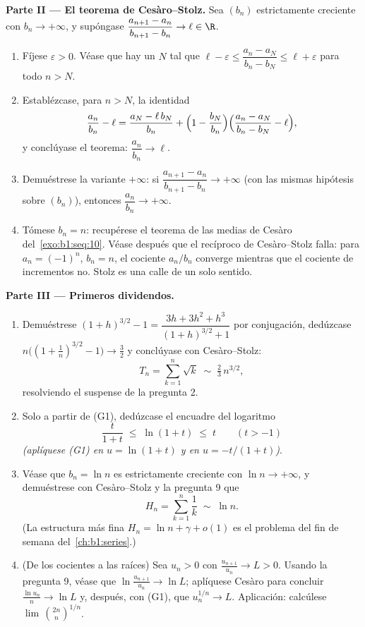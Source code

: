 \begin{problem}[{Problema del fin de semana --- el teorema de
Cesàro--Stolz y la asintótica $u_n \sim \sqrt{3/n}$ para
$u_{n+1} = \sin u_n$}]
\medskip
\noindent\textbf{Parte II --- El teorema de Cesàro--Stolz.} Sea
$(b_n)$ estrictamente creciente con $b_n \to +\infty$, y supóngase
$\dfrac{a_{n+1} - a_n}{b_{n+1} - b_n} \to \ell \in \R$.
\begin{enumerate}[resume]
  \item Fíjese $\varepsilon > 0$. Véase que hay un $N$ tal que
        $\ell - \varepsilon \leq \dfrac{a_n - a_N}{b_n - b_N}
        \leq \ell + \varepsilon$ para todo $n > N$.
  \item Establézcase, para $n > N$, la identidad
        \[
        \frac{a_n}{b_n} - \ell
        = \frac{a_N - \ell\,b_N}{b_n}
        + \Bigl(1 - \frac{b_N}{b_n}\Bigr)
        \Bigl(\frac{a_n - a_N}{b_n - b_N} - \ell\Bigr),
        \]
        y conclúyase el teorema: $\dfrac{a_n}{b_n} \to \ell$.
  \item Demuéstrese la variante $+\infty$: si $\dfrac{a_{n+1} -
        a_n}{b_{n+1} - b_n} \to +\infty$ (con las mismas hipótesis
        sobre $(b_n)$), entonces $\dfrac{a_n}{b_n} \to +\infty$.
  \item Tómese $b_n = n$: recupérese el teorema de las medias de
        Cesàro del~\cref{exo:b1:seq:10}. Véase después que el
        recíproco de Cesàro--Stolz falla: para $a_n = (-1)^n$,
        $b_n = n$, el cociente $a_n/b_n$ converge mientras que el
        cociente de incrementos no. Stolz es una calle de un solo
        sentido.
\end{enumerate}

\medskip
\noindent\textbf{Parte III --- Primeros dividendos.}
\begin{enumerate}[resume]
  \item Demuéstrese $(1+h)^{3/2} - 1 = \dfrac{3h + 3h^2 +
        h^3}{(1+h)^{3/2} + 1}$ por conjugación, dedúzcase
        $n\bigl((1 + \tfrac1n)^{3/2} - 1\bigr) \to \tfrac32$ y
        conclúyase con Cesàro--Stolz:
        \[
        T_n = \sum_{k=1}^{n} \sqrt k \;\sim\; \tfrac23\,
        n^{3/2} ,
        \]
        resolviendo el suspense de la pregunta 2.
  \item Solo a partir de (G1), dedúzcase el encuadre del logaritmo
        \[
        \frac{t}{1 + t} \;\leq\; \ln(1 + t) \;\leq\; t
        \qquad (t > -1)
        \]
        \emph{(aplíquese (G1) en $u = \ln(1+t)$ y en
        $u = -t/(1+t)$)}.
  \item Véase que $b_n = \ln n$ es estrictamente creciente con
        $\ln n \to +\infty$, y demuéstrese con Cesàro--Stolz y la
        pregunta 9 que
        \[
        H_n = \sum_{k=1}^{n} \frac 1k \;\sim\; \ln n .
        \]
        (La estructura más fina $H_n = \ln n + \gamma + o(1)$ es el
        problema del fin de semana del~\cref{ch:b1:series}.)
  \item (De los cocientes a las raíces) Sea $u_n > 0$ con
        $\frac{u_{n+1}}{u_n} \to L > 0$. Usando la pregunta 9, véase
        que $\ln\frac{u_{n+1}}{u_n} \to \ln L$; aplíquese Cesàro para
        concluir $\frac{\ln u_n}{n} \to \ln L$ y, después, con (G1),
        que $u_n^{1/n} \to L$. Aplicación: calcúlese
        $\lim\,\binom{2n}{n}^{1/n}$.
\end{enumerate}


\end{problem}
